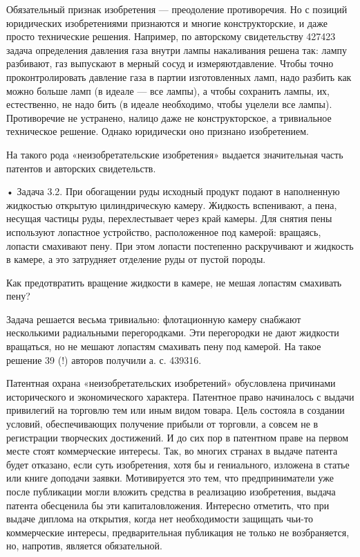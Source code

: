 Обязательный  признак изобретения  —  преодоление  противоречия. Но  с
позиций юридических изобретениями признаются и многие конструкторские,
и   даже  просто   технические   решения.   Например,  по   авторскому
свидетельству  427423 задача  определения давления  газа внутри  лампы
накаливания решена так: лампу разбивают,  газ выпускают в мерный сосуд
и  измеряютдавление. Чтобы  точно  проконтролировать  давление газа  в
партии  изготовленных ламп,  надо  разбить как  можно  больше ламп  (в
идеале — все лампы), а чтобы сохранить лампы, их, естественно, не надо
бить (в идеале  необходимо, чтобы уцелели все  лампы). Противоречие не
устранено, налицо  даже не конструкторское, а  тривиальное техническое
решение. Однако юридически оно признано изобретением.

На такого рода  «неизобретательские изобретения» выдается значительная
часть патентов и авторских свидетельств.

•  Задача  3.2.   При  обогащении  руды  исходный   продукт  подают  в
наполненную   жидкостью  открытую   цилиндрическую  камеру.   Жидкость
вспенивают, а  пена, несущая  частицы руды, перехлестывает  через край
камеры. Для снятия пены используют лопастное устройство, расположенное
под  камерой:  вращаясь,  лопасти  смахивают пену.  При  этом  лопасти
постепенно  раскручивают  и  жидкость   в  камере,  а  это  затрудняет
отделение руды от пустой породы.

Как  предотвратить  вращение  жидкости  в камере,  не  мешая  лопастям
смахивать пену?

Задача  решается  весьма   тривиально:  флотационную  камеру  снабжают
несколькими  радиальными   перегородками.  Эти  перегородки   не  дают
жидкости вращаться, но не мешают  лопастям смахивать пену под камерой.
На такое решение 39 (!) авторов получили а. с. 439316.

Патентная   охрана    «неизобретательских   изобретений»   обусловлена
причинами  исторического и  экономического характера.  Патентное право
начиналось с выдачи привилегий на  торговлю тем или иным видом товара.
Цель состояла в создании  условий, обеспечивающих получение прибыли от
торговли, а  совсем не в  регистрации творческих достижений. И  до сих
пор в  патентном праве  на первом  месте стоят  коммерческие интересы.
Так,  во многих  странах в  выдаче патента  будет отказано,  если суть
изобретения,  хотя  бы и  гениального,  изложена  в статье  или  книге
доподачи заявки.  Мотивируется это тем, что  предприниматели уже после
публикации  могли вложить  средства в  реализацию изобретения,  выдача
патента обесценила  бы эти  капиталовложения. Интересно  отметить, что
при  выдаче  диплома на  открытия,  когда  нет необходимости  защищать
чьи-то коммерческие интересы, предварительная  публикация не только не
возбраняется, но, напротив, является обязательной.

